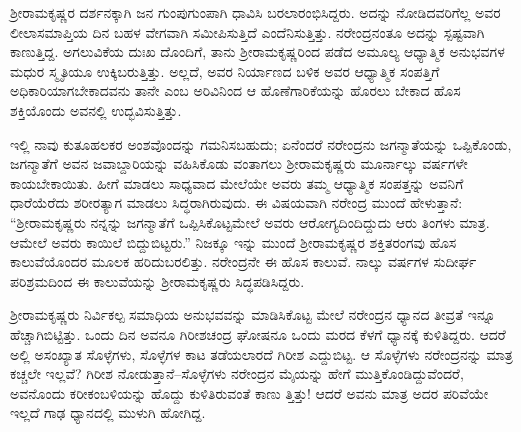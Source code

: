ಶ್ರೀರಾಮಕೃಷ್ಣರ ದರ್ಶನಕ್ಕಾಗಿ ಜನ ಗುಂಪುಗುಂಪಾಗಿ ಧಾವಿಸಿ ಬರಲಾರಂಭಿಸಿದ್ದರು. ಅದನ್ನು ನೋಡಿದವರಿಗೆಲ್ಲ ಅವರ ಲೀಲಾಸಮಾಪ್ತಿಯ ದಿನ ಬಹಳ ವೇಗವಾಗಿ ಸಮೀಪಿಸುತ್ತಿದೆ ಎಂದೆನಿಸುತ್ತಿತ್ತು. ನರೇಂದ್ರನಂತೂ ಅದನ್ನು ಸ್ಪಷ್ಟವಾಗಿ ಕಾಣುತ್ತಿದ್ದ. ಅಗಲುವಿಕೆಯ ದುಃಖ ದೊಂದಿಗೆ, ತಾನು ಶ್ರೀರಾಮಕೃಷ್ಣರಿಂದ ಪಡೆದ ಅಮೂಲ್ಯ ಆಧ್ಯಾತ್ಮಿಕ ಅನುಭವಗಳ ಮಧುರ ಸ್ಮೃತಿಯೂ ಉಕ್ಕಿಬರುತ್ತಿತ್ತು. ಅಲ್ಲದೆ, ಅವರ ನಿರ್ಯಾಣದ ಬಳಿಕ ಅವರ ಆಧ್ಯಾತ್ಮಿಕ ಸಂಪತ್ತಿಗೆ ಅಧಿಕಾರಿಯಾಗಬೇಕಾದವನು ತಾನೇ ಎಂಬ ಅರಿವಿನಿಂದ ಆ ಹೊಣೆಗಾರಿಕೆಯನ್ನು ಹೊರಲು ಬೇಕಾದ ಹೊಸ ಶಕ್ತಿಯೊಂದು ಅವನಲ್ಲಿ ಉದ್ಭವಿಸುತ್ತಿತ್ತು.

ಇಲ್ಲಿ ನಾವು ಕುತೂಹಲಕರ ಅಂಶವೊಂದನ್ನು ಗಮನಿಸಬಹುದು; ಏನೆಂದರೆ ನರೇಂದ್ರನು ಜಗನ್ಮಾತೆಯನ್ನು ಒಪ್ಪಿಕೊಂಡು, ಜಗನ್ಮಾತೆಗೆ ಅವನ ಜವಾಬ್ದಾರಿಯನ್ನು ವಹಿಸಿಕೊಡು ವಂತಾಗಲು ಶ್ರೀರಾಮಕೃಷ್ಣರು ಮೂರ್ನಾಲ್ಕು ವರ್ಷಗಳೇ ಕಾಯಬೇಕಾಯಿತು. ಹೀಗೆ ಮಾಡಲು ಸಾಧ್ಯವಾದ ಮೇಲೆಯೇ ಅವರು ತಮ್ಮ ಆಧ್ಯಾತ್ಮಿಕ ಸಂಪತ್ತನ್ನು ಅವನಿಗೆ ಧಾರೆಯೆರೆದು ಶರೀರತ್ಯಾಗ ಮಾಡಲು ಸಿದ್ಧರಾಗಿರುವುದು. ಈ ವಿಷಯವಾಗಿ ನರೇಂದ್ರ ಮುಂದೆ ಹೇಳುತ್ತಾನೆ: “ಶ್ರೀರಾಮಕೃಷ್ಣರು ನನ್ನನ್ನು ಜಗನ್ಮಾತೆಗೆ ಒಪ್ಪಿಸಿಕೊಟ್ಟಮೇಲೆ ಅವರು ಆರೋಗ್ಯದಿಂದಿದ್ದುದು ಆರು ತಿಂಗಳು ಮಾತ್ರ. ಆಮೇಲೆ ಅವರು ಕಾಯಿಲೆ ಬಿದ್ದುಬಿಟ್ಟರು.” ನಿಜಕ್ಕೂ ಇನ್ನು ಮುಂದೆ ಶ್ರೀರಾಮಕೃಷ್ಣರ ಶಕ್ತಿತರಂಗವು ಹೊಸ ಕಾಲುವೆಯೊಂದರ ಮೂಲಕ ಹರಿದುಬರಲಿತ್ತು. ನರೇಂದ್ರನೇ ಈ ಹೊಸ ಕಾಲುವೆ. ನಾಲ್ಕು ವರ್ಷಗಳ ಸುದೀರ್ಘ ಪರಿಶ್ರಮದಿಂದ ಈ ಕಾಲುವೆಯನ್ನು ಶ್ರೀರಾಮಕೃಷ್ಣರು ಸಿದ್ಧಪಡಿಸಿದ್ದರು.

ಶ್ರೀರಾಮಕೃಷ್ಣರು ನಿರ್ವಿಕಲ್ಪ ಸಮಾಧಿಯ ಅನುಭವವನ್ನು ಮಾಡಿಸಿಕೊಟ್ಟ ಮೇಲೆ ನರೇಂದ್ರನ ಧ್ಯಾನದ ತೀವ್ರತೆ ಇನ್ನೂ ಹೆಚ್ಚಾಗಿಬಿಟ್ಟಿತ್ತು. ಒಂದು ದಿನ ಅವನೂ ಗಿರೀಶಚಂದ್ರ ಘೋಷನೂ ಒಂದು ಮರದ ಕೆಳಗೆ ಧ್ಯಾನಕ್ಕೆ ಕುಳಿತಿದ್ದರು. ಆದರೆ ಅಲ್ಲಿ ಅಸಂಖ್ಯಾತ ಸೊಳ್ಳೆಗಳು, ಸೊಳ್ಳೆಗಳ ಕಾಟ ತಡೆಯಲಾರದೆ ಗಿರೀಶ ಎದ್ದುಬಿಟ್ಟ. ಆ ಸೊಳ್ಳೆಗಳು ನರೇಂದ್ರನನ್ನು ಮಾತ್ರ ಕಚ್ಚಲೇ ಇಲ್ಲವೆ? ಗಿರೀಶ ನೋಡುತ್ತಾನೆ–ಸೊಳ್ಳೆಗಳು ನರೇಂದ್ರನ ಮೈಯನ್ನು ಹೇಗೆ ಮುತ್ತಿಕೊಂಡಿದ್ದುವೆಂದರೆ, ಅವನೊಂದು ಕರೀಕಂಬಳಿಯನ್ನು ಹೊದ್ದು ಕುಳಿತಿರುವಂತೆ ಕಾಣು ತ್ತಿತ್ತು! ಆದರೆ ಅವನು ಮಾತ್ರ ಅದರ ಪರಿವೆಯೇ ಇಲ್ಲದೆ ಗಾಢ ಧ್ಯಾನದಲ್ಲಿ ಮುಳುಗಿ ಹೋಗಿದ್ದ.

